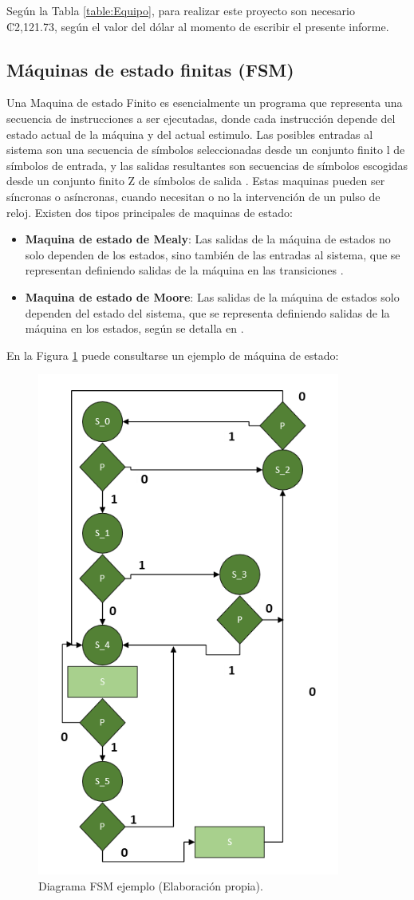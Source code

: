 Según la Tabla \ref{table:Equipo}, para realizar este proyecto son necesario ₡2,121.73, según el valor del dólar al momento de escribir el presente informe. 


\subsection{Máquinas de estado finitas (FSM)}

Una Maquina de estado Finito es esencialmente un programa que representa una secuencia de instrucciones a ser ejecutadas, donde cada instrucción depende del estado actual de la máquina y del actual estimulo. Las posibles entradas al sistema son una secuencia de símbolos seleccionadas desde un conjunto finito l de símbolos de entrada, y las salidas resultantes son secuencias de símbolos escogidas desde un conjunto finito Z de símbolos de salida \cite{alavi2016maquinas}. 
Estas maquinas pueden ser síncronas o asíncronas, cuando necesitan o no la intervención de un pulso de reloj.
Existen dos tipos principales de maquinas de estado:
\begin{itemize}
    \item \textbf{Maquina de estado de Mealy}: Las salidas de la máquina de estados no solo dependen de los estados, sino también de las entradas al sistema, que se representan definiendo salidas de la máquina en las transiciones \cite{Maquinadeestados}.
    \item \textbf{Maquina de estado de Moore}: Las salidas de la máquina de estados solo dependen del estado del sistema, que se representa definiendo salidas de la máquina en los estados, según se detalla en \cite{Maquinadeestados}. 
\end{itemize}

En la Figura \ref{fig:FSMej} puede consultarse un ejemplo de máquina de estado: 

\begin{figure}[H]
\centering
\includegraphics[scale=1.1]{./Figuras/Nota_teorica/Diagrama_de_stados_viejo}
\caption{Diagrama FSM ejemplo (Elaboración propia).}
\label{fig:FSMej}
\end{figure}